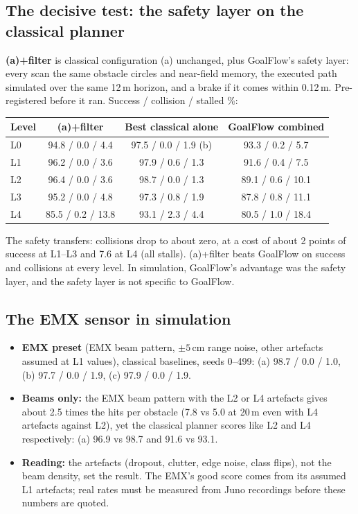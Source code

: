 \documentclass[11pt,a4paper]{article}
\begin{document}
\subsection{The decisive test: the safety layer on the classical planner}
\label{sec:afilter}
\textbf{(a)+filter} is classical configuration (a) unchanged, plus GoalFlow's safety layer: every scan the same
obstacle circles and near-field memory, the executed path simulated over the same 12\,m horizon, and a brake if it
comes within 0.12\,m. Pre-registered before it ran. Success / collision / stalled \%:
\begin{table}[H]
\small
\begin{tabular}{@{}lccc@{}}
\toprule
Level & (a)+filter & Best classical alone & GoalFlow combined \\
\midrule
L0 & 94.8 / 0.0 / 4.4 & 97.5 / 0.0 / 1.9 (b) & 93.3 / 0.2 / 5.7 \\
L1 & 96.2 / 0.0 / 3.6 & 97.9 / 0.6 / 1.3 & 91.6 / 0.4 / 7.5 \\
L2 & 96.4 / 0.0 / 3.6 & 98.7 / 0.0 / 1.3 & 89.1 / 0.6 / 10.1 \\
L3 & 95.2 / 0.0 / 4.8 & 97.3 / 0.8 / 1.9 & 87.8 / 0.8 / 11.1 \\
L4 & 85.5 / 0.2 / 13.8 & 93.1 / 2.3 / 4.4 & 80.5 / 1.0 / 18.4 \\
\bottomrule
\end{tabular}
\end{table}
The safety transfers: collisions drop to about zero, at a cost of about 2 points of success at L1--L3 and 7.6 at L4
(all stalls). (a)+filter beats GoalFlow on success and collisions at every level. In simulation, GoalFlow's
advantage was the safety layer, and the safety layer is not specific to GoalFlow.

\subsection{The EMX sensor in simulation}
\begin{itemize}[nosep]
  \item \textbf{EMX preset} (EMX beam pattern, $\pm5$\,cm range noise, other artefacts assumed at L1 values),
        classical baselines, seeds 0--499: (a) 98.7 / 0.0 / 1.0, (b) 97.7 / 0.0 / 1.9, (c) 97.9 / 0.0 / 1.9.
  \item \textbf{Beams only:} the EMX beam pattern with the L2 or L4 artefacts gives about 2.5 times the hits per
        obstacle (7.8 vs 5.0 at 20\,m even with L4 artefacts against L2), yet the classical planner scores like L2
        and L4 respectively: (a) 96.9 vs 98.7 and 91.6 vs 93.1.
  \item \textbf{Reading:} the artefacts (dropout, clutter, edge noise, class flips), not the beam density, set the
        result. The EMX's good score comes from its assumed L1 artefacts; real rates must be measured from Juno
        recordings before these numbers are quoted.
\end{itemize}
\end{document}

